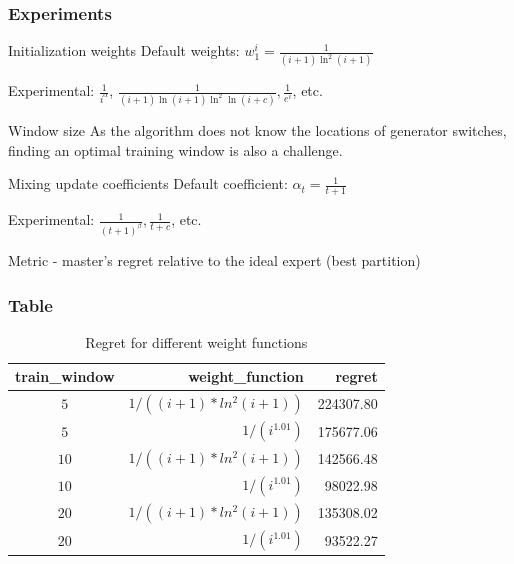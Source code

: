\documentclass{beamer}
\begin{document}
\begin{frame}
\frametitle{Experiments}
\begin{block}{Initialization weights}
Default weights: $w_1^i = \frac{1}{(i+1)\ln^2(i+1)}$

Experimental: $\frac{1}{i^\alpha}$, $\frac{1}{(i+1)\ln(i+1)\ln^2\ln(i+c)}, \frac{1}{e^i}$, etc.
\end{block}

\begin{block}{Window size}
As the algorithm does not know the locations of generator switches, finding an optimal training window is also a challenge.
\end{block}

\begin{block}{Mixing update coefficients}
Default coefficient: $\alpha_t = \frac{1}{t+1}$

Experimental:  $\frac{1}{(t+1)^\beta}, \frac{1}{t+c}$, etc.

\end{block}

Metric - master's regret relative to the ideal expert (best partition)
\end{frame}


\begin{frame}


\frametitle{Table}
\begin{table}


\begin{tabular}{crr}
\toprule
train\_window & weight\_function & regret\\
\midrule
$5$ & $1 / ((i + 1) * ln^2(i + 1))$ & 224307.80 \\
$5$ & $1 / (i^{1.01})$ & 175677.06 \\
$10$ & $1 / ((i + 1) * ln^2(i + 1))$ &  142566.48 \\
$10$ & $1 / (i^{1.01})$ &  98022.98 \\
$20$ & $1 / ((i + 1) * ln^2(i + 1))$  & 135308.02 \\
$20$ & $1 / (i^{1.01})$ & 93522.27 \\
\bottomrule
\end{tabular}


\caption{Regret for different weight functions}
\end{table}



\end{frame}
\end{document}
